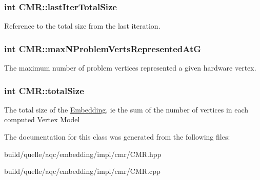 \subsubsection[{\texorpdfstring{last\+Iter\+Total\+Size}{lastIterTotalSize}}]{\setlength{\rightskip}{0pt plus 5cm}int C\+M\+R\+::last\+Iter\+Total\+Size\hspace{0.3cm}{\ttfamily [protected]}}\hypertarget{a00031_a514e46dd106cda11ad355e423bc8f1a6}{}\label{a00031_a514e46dd106cda11ad355e423bc8f1a6}
Reference to the total size from the last iteration. 
\subsubsection[{\texorpdfstring{max\+N\+Problem\+Verts\+Represented\+AtG}{maxNProblemVertsRepresentedAtG}}]{\setlength{\rightskip}{0pt plus 5cm}int C\+M\+R\+::max\+N\+Problem\+Verts\+Represented\+AtG\hspace{0.3cm}{\ttfamily [protected]}}\hypertarget{a00031_a81bea6884182203db7e4ed7f410ff92e}{}\label{a00031_a81bea6884182203db7e4ed7f410ff92e}
The maximum number of problem vertices represented a given hardware vertex. 
\subsubsection[{\texorpdfstring{total\+Size}{totalSize}}]{\setlength{\rightskip}{0pt plus 5cm}int C\+M\+R\+::total\+Size\hspace{0.3cm}{\ttfamily [protected]}}\hypertarget{a00031_a620261e04b1b60f5412de7f7a3d60125}{}\label{a00031_a620261e04b1b60f5412de7f7a3d60125}
The total size of the \hyperlink{a00050}{Embedding}, ie the sum of the number of vertices in each computed Vertex Model 

The documentation for this class was generated from the following files\+:\begin{DoxyCompactItemize}
\item 
build/quelle/aqc/embedding/impl/cmr/\+C\+M\+R.\+hpp\item 
build/quelle/aqc/embedding/impl/cmr/\+C\+M\+R.\+cpp\end{DoxyCompactItemize}
